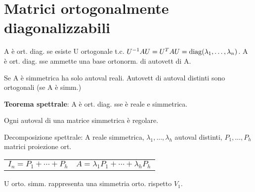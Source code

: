\section{Matrici ortogonalmente diagonalizzabili}

A è ort. diag. se esiste U ortogonale t.c. $U^{-1}AU = U^TAU = \mathrm{diag}(\lambda_1, \dots, \lambda_n)$.
A è ort. diag. sse ammette una base ortonorm. di autovett di A.

Se A è simmetrica ha solo autoval reali. Autovett di autoval distinti sono ortogonali (se A è simm.)

\textbf{Teorema spettrale}: A è ort. diag. sse è reale e simmetrica.

Ogni autoval di una matrice simmetrica è regolare.

Decomposizione spettrale: A reale simmetrica, $\lambda_1, \dots, \lambda_h$ autoval distinti, $P_1, \dots, P_h$ matrici proiezione ort.
\begin{tabular}{ll}
	$I_n = P_1 + \cdots + P_h$ & $A = \lambda_1P_1 + \cdots + \lambda_hP_h$
\end{tabular}

U orto. simm. rappresenta una simmetria orto. rispetto $V_1$.
